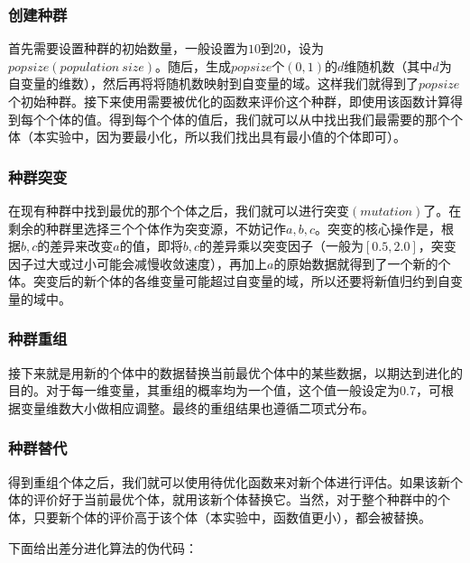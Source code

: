 \subsubsection{创建种群}

首先需要设置种群的初始数量，一般设置为$10$到$20$，设为$popsize(population~size)$。随后，生成$popsize$个$(0,1)$的$d$维随机数（其中$d$为自变量的维数），然后再将将随机数映射到自变量的域。这样我们就得到了$popsize$个初始种群。接下来使用需要被优化的函数来评价这个种群，即使用该函数计算得到每个个体的值。得到每个个体的值后，我们就可以从中找出我们最需要的那个个体（本实验中，因为要最小化，所以我们找出具有最小值的个体即可）。

\subsubsection{种群突变}

在现有种群中找到最优的那个个体之后，我们就可以进行突变$(mutation)$了。在剩余的种群里选择三个个体作为突变源，不妨记作$a,b,c$。突变的核心操作是，根据$b,c$的差异来改变$a$的值，即将$b,c$的差异乘以突变因子（一般为$[0.5,2.0]$，突变因子过大或过小可能会减慢收敛速度），再加上$a$的原始数据就得到了一个新的个体。突变后的新个体的各维变量可能超过自变量的域，所以还要将新值归约到自变量的域中。

\subsubsection{种群重组}

接下来就是用新的个体中的数据替换当前最优个体中的某些数据，以期达到进化的目的。对于每一维变量，其重组的概率均为一个值，这个值一般设定为$0.7$，可根据变量维数大小做相应调整。最终的重组结果也遵循二项式分布。

\subsubsection{种群替代}

得到重组个体之后，我们就可以使用待优化函数来对新个体进行评估。如果该新个体的评价好于当前最优个体，就用该新个体替换它。当然，对于整个种群中的个体，只要新个体的评价高于该个体（本实验中，函数值更小），都会被替换。


下面给出差分进化算法的伪代码：

